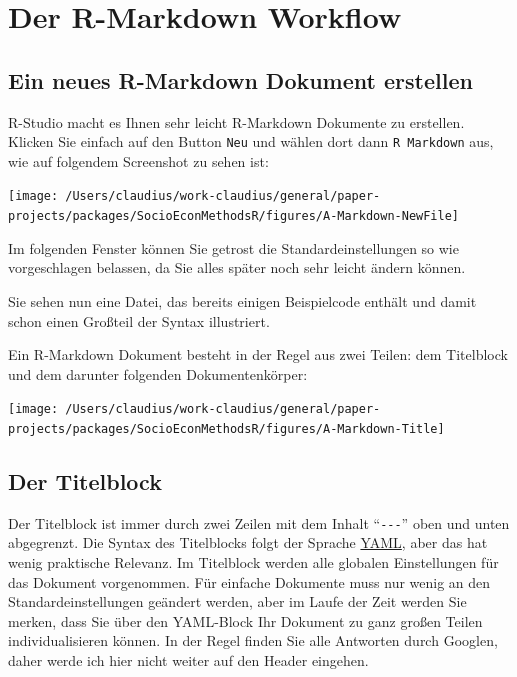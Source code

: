 \documentclass[]{book}
\begin{document}
\section{Der R-Markdown Workflow}\label{der-r-markdown-workflow}

\subsection{Ein neues R-Markdown Dokument
erstellen}\label{ein-neues-r-markdown-dokument-erstellen}

R-Studio macht es Ihnen sehr leicht R-Markdown Dokumente zu erstellen.
Klicken Sie einfach auf den Button \texttt{Neu} und wählen dort dann
\texttt{R\ Markdown} aus, wie auf folgendem Screenshot zu sehen ist:

\begin{center}\texttt{[image: /Users/claudius/work-claudius/general/paper-projects/packages/SocioEconMethodsR/figures/A-Markdown-NewFile]} \end{center}

Im folgenden Fenster können Sie getrost die Standardeinstellungen so wie
vorgeschlagen belassen, da Sie alles später noch sehr leicht ändern
können.

Sie sehen nun eine Datei, das bereits einigen Beispielcode enthält und
damit schon einen Großteil der Syntax illustriert.

Ein R-Markdown Dokument besteht in der Regel aus zwei Teilen: dem
Titelblock und dem darunter folgenden Dokumentenkörper:

\begin{center}\texttt{[image: /Users/claudius/work-claudius/general/paper-projects/packages/SocioEconMethodsR/figures/A-Markdown-Title]} \end{center}

\subsection{Der Titelblock}\label{der-titelblock}

Der Titelblock ist immer durch zwei Zeilen mit dem Inhalt
``\texttt{-\/-\/-}'' oben und unten abgegrenzt. Die Syntax des
Titelblocks folgt der Sprache
\href{https://de.wikipedia.org/wiki/YAML}{YAML}, aber das hat wenig
praktische Relevanz. Im Titelblock werden alle globalen Einstellungen
für das Dokument vorgenommen. Für einfache Dokumente muss nur wenig an
den Standardeinstellungen geändert werden, aber im Laufe der Zeit werden
Sie merken, dass Sie über den YAML-Block Ihr Dokument zu ganz großen
Teilen individualisieren können. In der Regel finden Sie alle Antworten
durch Googlen, daher werde ich hier nicht weiter auf den Header
eingehen.
\end{document}
